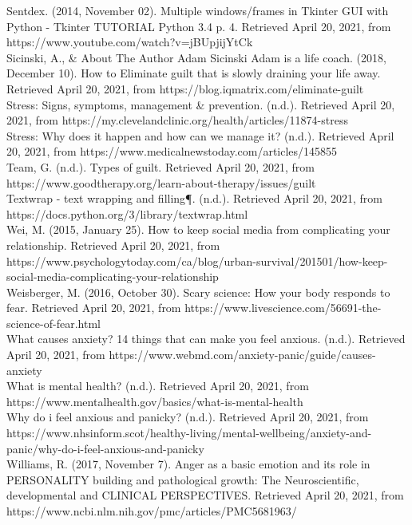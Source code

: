 \documentclass{article}
\begin{document}
    Sentdex. (2014, November 02). Multiple windows/frames in Tkinter GUI with Python - Tkinter TUTORIAL Python 3.4 p. 4. Retrieved April 20, 2021, from https://www.youtube.com/watch?v=jBUpjijYtCk \\

    Sicinski, A., & About The Author Adam Sicinski Adam is a life coach. (2018, December 10). How to Eliminate guilt that is slowly draining your life away. Retrieved April 20, 2021, from https://blog.iqmatrix.com/eliminate-guilt \\

    Stress: Signs, symptoms, management & prevention. (n.d.). Retrieved April 20, 2021, from https://my.clevelandclinic.org/health/articles/11874-stress \\

    Stress: Why does it happen and how can we manage it? (n.d.). Retrieved April 20, 2021, from https://www.medicalnewstoday.com/articles/145855 \\

    Team, G. (n.d.). Types of guilt. Retrieved April 20, 2021, from \\https://www.goodtherapy.org/learn-about-therapy/issues/guilt \\

    Textwrap - text wrapping and filling¶. (n.d.). Retrieved April 20, 2021, from https://docs.python.org/3/library/textwrap.html \\

    Wei, M. (2015, January 25). How to keep social media from complicating your relationship. Retrieved April 20, 2021, from \\ https://www.psychologytoday.com/ca/blog/urban-survival/201501/how-keep-social-media-complicating-your-relationship \\

    Weisberger, M. (2016, October 30). Scary science: How your body responds to fear. Retrieved April 20, 2021, from https://www.livescience.com/56691-the-science-of-fear.html \\

    What causes anxiety? 14 things that can make you feel anxious. (n.d.). Retrieved April 20, 2021, from https://www.webmd.com/anxiety-panic/guide/causes-anxiety \\

    What is mental health? (n.d.). Retrieved April 20, 2021, from \\https://www.mentalhealth.gov/basics/what-is-mental-health \\

    Why do i feel anxious and panicky? (n.d.). Retrieved April 20, 2021, from https://www.nhsinform.scot/healthy-living/mental-wellbeing/anxiety-and-panic/why-do-i-feel-anxious-and-panicky \\

    Williams, R. (2017, November 7). Anger as a basic emotion and its role in PERSONALITY building and pathological growth: The Neuroscientific, developmental and CLINICAL PERSPECTIVES. Retrieved April 20, 2021, from https://www.ncbi.nlm.nih.gov/pmc/articles/PMC5681963/ \\
\end{document}
